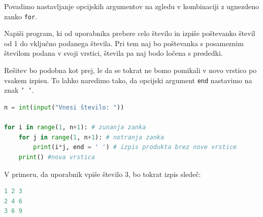 Povadimo nastavljanje opcijskih argumentov na zgledu v kombinaciji z ugnezdeno zanko \texttt{for}.

\begin{zgled}
Napiši program, ki od uporabnika prebere celo število in izpiše poštevanko števil od 1 do vključno podanega števila. Pri tem naj bo poštevanka s posameznim številom podana v svoji vrstici, števila pa naj bodo ločena s presledki.
\end{zgled}
\begin{resitev}
Rešitev bo podobna kot prej, le da se tokrat ne bomo pomikali v novo vrstico po vsakem izpisu. To lahko naredimo tako, da opcijski argument  \texttt{end} nastavimo na znak \texttt{' '}.

\begin{lstlisting}[language=Python]
n = int(input("Vnesi število: "))

for i in range(1, n+1): # zunanja zanka
    for j in range(1, n+1): # notranja zanka
        print(i*j, end = ' ') # izpis produkta brez nove vrstice
    print() #nova vrstica
\end{lstlisting}
V primeru, da uporabnik vpiše število 3, bo tokrat izpis sledeč:
\begin{lstlisting}[language=Python]
1 2 3
2 4 6
3 6 9
\end{lstlisting}
\end{resitev}
